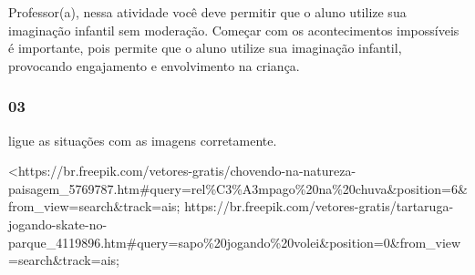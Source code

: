 Professor(a), nessa atividade você deve permitir que o aluno utilize sua
imaginação infantil sem moderação. Começar com os acontecimentos
impossíveis é importante, pois permite que o aluno utilize sua
imaginação infantil, provocando engajamento e envolvimento na criança.

\subsubsection{03}\label{section-65}

ligue as situações com as imagens corretamente.

\textless{}https://br.freepik.com/vetores-gratis/chovendo-na-natureza-paisagem\_5769787.htm\#query=rel\%C3\%A3mpago\%20na\%20chuva\&position=6\&from\_view=search\&track=ais;
https://br.freepik.com/vetores-gratis/tartaruga-jogando-skate-no-parque\_4119896.htm\#query=sapo\%20jogando\%20volei\&position=0\&from\_view=search\&track=ais;

